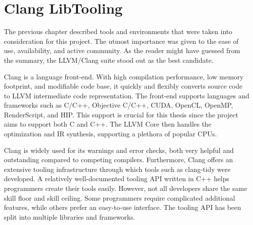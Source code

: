 \chapter{Clang LibTooling}



The previous chapter described tools and environments that were taken
into consideration for this project. 
The utmost importance was given to the ease of use, availability, and 
active community. 
As the reader might have guessed from the summary, the LLVM/Clang 
suite stood out as the best candidate.

Clang is a language front-end. With high compilation performance, 
low memory footprint, and modifiable code base, it quickly and flexibly 
converts source code to LLVM intermediate code representation. 
The front-end supports languages and frameworks such as C/C++, 
Objective C/C++, CUDA, OpenCL, OpenMP, RenderScript, and HIP. 
This support is crucial for this thesis since the project 
aims to support both C and C++. 
The LLVM Core then handles the optimization and IR synthesis, 
supporting a plethora of popular CPUs.

Clang is widely used for its warnings and error checks, both very 
helpful and outstanding compared to competing compilers. 
Furthermore, Clang offers an extensive tooling infrastructure 
through which tools such as clang-tidy were developed. 
A relatively well-documented tooling API written in C++ helps 
programmers create their tools easily. 
However, not all developers share the same skill floor and skill ceiling. 
Some programmers require complicated additional features, while others 
prefer an easy-to-use interface. 
The tooling API has been split into multiple libraries and frameworks. 

